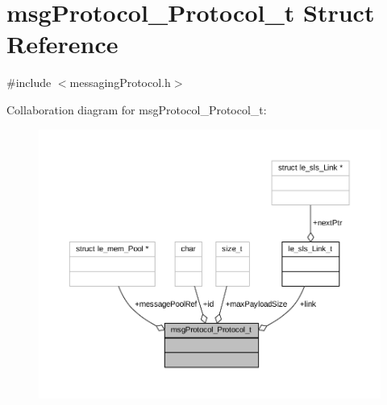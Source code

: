 \hypertarget{structmsg_protocol___protocol__t}{}\section{msg\+Protocol\+\_\+\+Protocol\+\_\+t Struct Reference}
\label{structmsg_protocol___protocol__t}


{\ttfamily \#include $<$messaging\+Protocol.\+h$>$}



Collaboration diagram for msg\+Protocol\+\_\+\+Protocol\+\_\+t\+:
\nopagebreak
\begin{figure}[H]
\begin{center}
\leavevmode
\includegraphics[width=350pt]{structmsg_protocol___protocol__t__coll__graph}
\end{center}
\end{figure}
